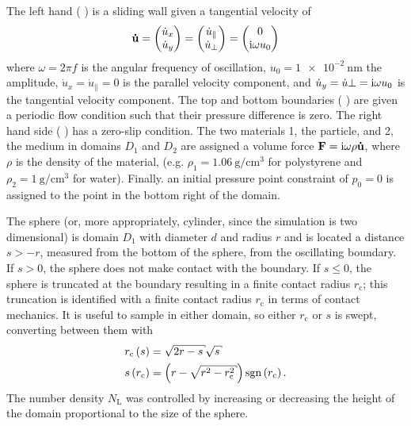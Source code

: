 The left hand (%
) %
is a sliding wall given a tangential velocity of 
\begin{equation}
\mathbf{\dot{u}} =
\begin{pmatrix}
	\dot{u}_x\\
	\dot{u}_y
\end{pmatrix}
=
\begin{pmatrix}
	\dot{u}_\parallel\\
	\dot{u}_\perp
\end{pmatrix}
=
\begin{pmatrix}
	0\\
	{\mathrm{i}}\omega u_0	
\end{pmatrix}
\end{equation}
where $\omega=2\pi f$ is the angular frequency of oscillation,
$u_0=\SI{1e-2}{\nano\meter}$ the amplitude, $\dot{u}_x=\dot{u}_\parallel=0$
is the parallel velocity component, and
$\dot{u}_y=\dot{u}{\perp}={\mathrm{i}}\omega u_0$ is the tangential velocity
component.
The top and bottom
boundaries
(%
 )%
are given a periodic flow condition such that their pressure difference
is zero.  The right hand side (%
) %
has a zero-slip condition.  The two materials 1, the particle, and 2, the
medium in domains $D_1$ and $D_2$ are assigned a volume force $\mathbf{F}={\mathrm{i}} \omega \rho
\mathbf{\dot{u}}$,
where $\rho$ is the density of the material, (e.g. $\rho_1 =
\SI{1.06}{\gram\per\centi\meter\cubed}$ for polystyrene and $\rho_2 =
\SI{1}{\gram\per\centi\meter\cubed}$ for water).  Finally. an initial pressure point
constraint of $p_0=0$ is assigned to the point in the bottom right of the
domain.  

The sphere (or, more appropriately, cylinder, since the simulation is two
dimensional) is domain $D_1$ with diameter $d$ and radius $r$ and is
located a distance $s>-r$, measured from the bottom of the sphere, from the
oscillating boundary.  If $s>0$, the sphere does not make contact with the
boundary.  If $s\leq0$, the sphere is truncated at the boundary resulting
in a finite contact radius $r_\mathrm{c}$; this truncation is identified with
a finite contact radius $r_\mathrm{c}$ in terms of contact mechanics.
It is useful to sample in either domain, so
either $r_\mathrm{c}$ or $s$ is swept, converting between them with
\begin{align}
 r_\mathrm{c}\left(s\right) &= \sqrt{2r-s}\sqrt{s}\\
 s\left(r_\mathrm{c}\right) &= \left(r-\sqrt{r^2-r_\mathrm{c}^2}\right)\sgn\left(r_\mathrm{c}\right).
\end{align}
The number density $N_\mathrm{L}$ was controlled by increasing or
decreasing the height of the domain proportional to the size of the sphere.

